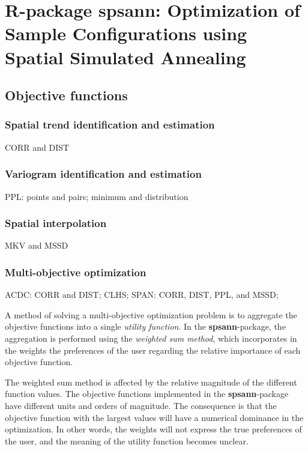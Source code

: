 \artigofalse
\chapter{R-package spsann: Optimization of Sample Configurations using Spatial 
Simulated Annealing}
\label{apen:spsann}

% 

\section{Objective functions}

\subsection{Spatial trend identification and estimation}

CORR and DIST

\subsection{Variogram identification and estimation}

PPL: points and pairs; minimum and distribution

\subsection{Spatial interpolation}

MKV and MSSD

\subsection{Multi-objective optimization}

ACDC: CORR and DIST;
CLHS;
SPAN: CORR, DIST, PPL, and MSSD;

A method of solving a multi-objective optimization problem is to aggregate 
the objective functions into a single \textit{utility function}. In the
\textbf{spsann}-package, the aggregation is performed using the \textit{weighted 
sum method}, which incorporates in the weights the preferences of the user 
regarding the relative importance of each objective function.

The weighted sum method is affected by the relative magnitude of the 
different function values. The objective functions implemented in the
\textbf{spsann}-package have different units and orders of magnitude. The 
consequence is that the objective function with the largest values will have 
a numerical dominance in the optimization. In other words, the weights will 
not express the true preferences of the user, and the meaning of the utility 
function becomes unclear.


